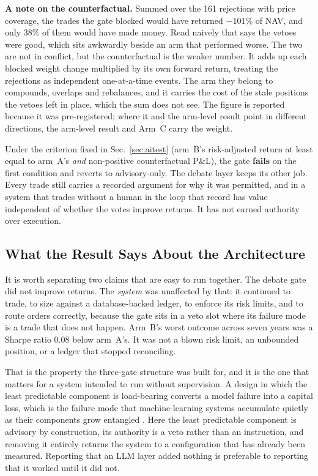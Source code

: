 \documentclass[10pt,twocolumn]{IEEEtran}
\begin{document}
\textbf{A note on the counterfactual.} Summed over the 161 rejections with
price coverage, the trades the gate blocked would have returned $-101\%$ of
NAV, and only 38\% of them would have made money. Read naively that says the
vetoes were good, which sits awkwardly beside an arm that performed worse. The
two are not in conflict, but the counterfactual is the weaker number. It adds
up each blocked weight change multiplied by its own forward return, treating
the rejections as independent one-at-a-time events. The arm they belong to
compounds, overlaps and rebalances, and it carries the cost of the stale
positions the vetoes left in place, which the sum does not see. The figure
is reported because it was pre-registered; where it and the arm-level result
point in different directions, the arm-level result and Arm~C carry the weight.

Under the criterion fixed in Sec.~\ref{sec:aitest} (arm~B's risk-adjusted
return at least equal to arm~A's \emph{and} non-positive counterfactual P\&L),
the gate \textbf{fails} on the first condition and reverts to
advisory-only. The debate layer keeps its other job. Every trade still carries
a recorded argument for why it was permitted, and in a system that trades
without a human in the loop that record has value independent of whether the
votes improve returns. It has not earned authority over execution.

\subsection{What the Result Says About the Architecture}

It is worth separating two claims that are easy to run together. The debate
gate did not improve returns. The \emph{system} was unaffected by that: it
continued to trade, to size against a database-backed ledger, to enforce its
risk limits, and to route orders correctly, because the gate sits in a veto
slot where its failure mode is a trade that does not happen. Arm~B's worst
outcome across seven years was a Sharpe ratio 0.08 below arm~A's. It was not a
blown risk limit, an unbounded position, or a ledger that stopped reconciling.

That is the property the three-gate structure was built for, and it is the one
that matters for a system intended to run without supervision. A design in
which the least predictable component is load-bearing converts a model failure
into a capital loss, which is the failure mode that machine-learning systems
accumulate quietly as their components grow entangled \cite{sculley2015debt}.
Here the least predictable component is advisory by construction, its authority
is a veto rather than an instruction, and removing it entirely returns the
system to a configuration that has already been measured. Reporting that an LLM
layer added nothing is preferable to reporting that it worked until it did not.
\end{document}
